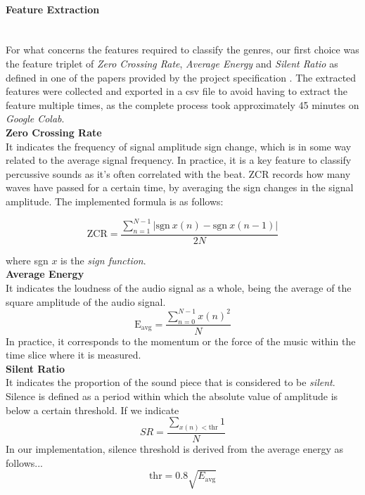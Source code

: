 \documentclass[12pt]{article}
\begin{document}
	\paragraph{Feature Extraction}\mbox{}\\\newline
	For what concerns the features required to classify the genres, our first choice was the feature triplet of \textit{Zero Crossing Rate}, \textit{Average Energy} and \textit{Silent Ratio} as defined in one of the papers provided by the project specification \cite{comparison}. The extracted features were collected and exported in a csv file to avoid having to extract the feature multiple times, as the complete process took approximately 45 minutes on \textit{Google Colab}.\\
	
	\textbf{Zero Crossing Rate}\\
	It indicates the frequency of signal amplitude sign change, which is in some way related to the average signal frequency. In practice, it is a key feature to classify percussive sounds as it's often correlated with the beat. ZCR records how many waves have passed for a certain time, by averaging the sign changes in the signal amplitude. The implemented formula is as follows:
	
	\begin{equation}
		\text{ZCR}=\dfrac{\sum_{n=1}^{N-1}{\bigg|\text{sgn}\ x(n)-\text{sgn}\ x(n-1)\bigg|}}{2N}
	\end{equation}
	
	where sgn $x$ is the \textit{sign function}.\\
	
	\textbf{Average Energy}\\
	It indicates the loudness of the audio signal as a whole, being the average of the square amplitude of the audio signal.
	\begin{equation}
		\text{E}_\text{avg}=\dfrac{\sum_{n=0}^{N-1}{x(n)^2}}{N}
	\end{equation}
	In practice, it corresponds to the momentum or the force of the music within the time slice where it is measured. \\
	
	\textbf{Silent Ratio}\\
	It indicates the proportion of the sound piece that is considered to be \textit{silent}. Silence is defined as a period within which the absolute value of amplitude is below a certain threshold. If we indicate
	\begin{equation}
		SR = \dfrac{\sum_{x(n)<\text{thr}} 1}{N}
	\end{equation}
	In our implementation, silence threshold is derived from the average energy as follows...
	\begin{equation}
		\text{thr}=0.8\sqrt{E_\text{avg}}
	\end{equation}
	\newpage
	
\end{document}
